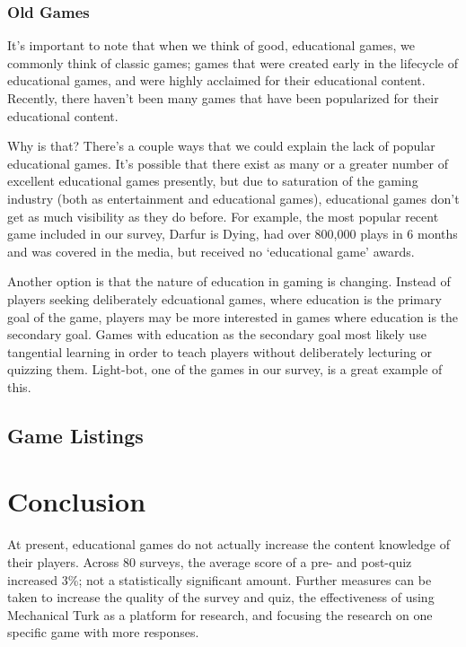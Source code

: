 \documentclass[12pt]{report}
\begin{document}
		\subsection{Old Games}
			It's important to note that when we think of good, educational games, we commonly think of classic games; games that were created early in the lifecycle of educational games, and were highly acclaimed for their educational content. Recently, there haven't been many games that have been popularized for their educational content.

			Why is that? There's a couple ways that we could explain the lack of popular educational games. It's possible that there exist as many or a greater number of excellent educational games presently, but due to saturation of the gaming industry (both as entertainment and educational games), educational games don't get as much visibility as they do before. For example, the most popular recent game included in our survey, Darfur is Dying, had over 800,000 plays in 6 months and was covered in the media, but received no `educational game' awards.

			Another option is that the nature of education in gaming is changing. Instead of players seeking deliberately edcuational games, where education is the primary goal of the game, players may be more interested in games where education is the secondary goal. Games with education as the secondary goal most likely use tangential learning in order to teach players without deliberately lecturing or quizzing them. Light-bot, one of the games in our survey, is a great example of this.
	\section{Game Listings}








	


\chapter{Conclusion}
	At present, educational games do not actually increase the content knowledge of their players. Across 80 surveys, the average score of a pre- and post-quiz increased 3\%; not a statistically significant amount. Further measures can be taken to increase the quality of the survey and quiz, the effectiveness of using Mechanical Turk as a platform for research, and focusing the research on one specific game with more responses.
\end{document}
